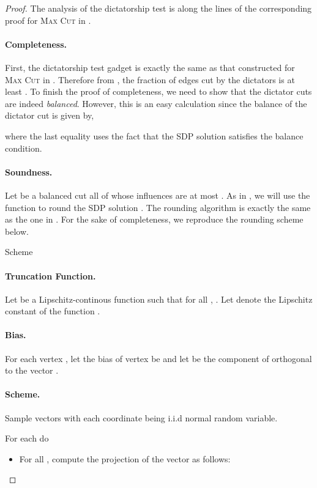 \documentclass[11pt]{article}
\theoremstyle{definition}
\newenvironment{mybox}
{\center \noindent\begin{boxedminipage}{1.0\linewidth}}
{\end{boxedminipage}
\noindent
}
\newcommand{\problemmacro}[1]{\texorpdfstring{\textsc{#1}}{#1}\xspace}
\newcommand{\maxcut}{\problemmacro{Max Cut}}
\numberwithin{equation}{section}
\let\origparagraph\paragraph
\renewcommand{\paragraph}[1]{\origparagraph{#1.}}
\begin{document}
\begin{proof}
The analysis of the dictatorship test is along the lines of the
corresponding proof for \maxcut in \cite{Raghavendra08}.

\paragraph{Completeness}
First, the dictatorship test gadget is exactly the same as that
constructed for \maxcut in \cite{Raghavendra08}.  Therefore from \cite{Raghavendra08}, the
fraction of edges cut by the dictators is at least .
To finish the proof of completeness, we need to show that the dictator
cuts are indeed {\it balanced}.  However, this is an easy calculation
since the balance of the  dictator cut is given by,

where the last equality uses the fact that the SDP solution satisfies
the balance condition.

\paragraph{Soundness}
Let  be a balanced cut all of whose
influences are at most .  As in \cite{Raghavendra08}, we will
use the function  to round the SDP solution .  The
rounding algorithm is exactly the same as the one in
\cite{Raghavendra08}.  For the sake of completeness, we reproduce the
rounding scheme below.

\begin{mybox}
       Scheme
      \paragraph{Truncation Function} Let  be a Lipschitz-continous
function such that for all , .  Let  denote the Lipschitz constant of the function
.



\paragraph{Bias}  For each vertex , let the bias of vertex
 be  and let  be the component of  orthogonal to the vector
.
\paragraph{Scheme}
	Sample  vectors  with each coordinate
      being i.i.d normal random variable.


      For each  do
      \begin{itemize}	
        \itemsep=0ex
      \item For all ,
        compute the projection  of the vector
	 as follows:
        

\end{itemize}
\end{mybox}
\end{proof}
\end{document}
